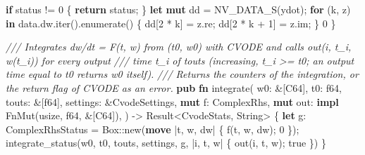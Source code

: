 \documentclass[
  10pt,
]{article}
\newenvironment{Shaded}{}{}
\newcommand{\BuiltInTok}[1]{\textcolor[rgb]{0.00,0.50,0.00}{#1}}
\newcommand{\CommentTok}[1]{\textcolor[rgb]{0.38,0.63,0.69}{\textit{#1}}}
\newcommand{\ConstantTok}[1]{\textcolor[rgb]{0.53,0.00,0.00}{#1}}
\newcommand{\ControlFlowTok}[1]{\textcolor[rgb]{0.00,0.44,0.13}{\textbf{#1}}}
\newcommand{\DataTypeTok}[1]{\textcolor[rgb]{0.56,0.13,0.00}{#1}}
\newcommand{\DecValTok}[1]{\textcolor[rgb]{0.25,0.63,0.44}{#1}}
\newcommand{\KeywordTok}[1]{\textcolor[rgb]{0.00,0.44,0.13}{\textbf{#1}}}
\newcommand{\NormalTok}[1]{#1}
\newcommand{\OperatorTok}[1]{\textcolor[rgb]{0.40,0.40,0.40}{#1}}
\newcommand{\PreprocessorTok}[1]{\textcolor[rgb]{0.74,0.48,0.00}{#1}}
\begin{document}
\begin{Shaded}
\begin{Highlighting}[]
    \ControlFlowTok{if}\NormalTok{ status }\OperatorTok{!=} \DecValTok{0} \OperatorTok{\{}
        \ControlFlowTok{return}\NormalTok{ status}\OperatorTok{;}
    \OperatorTok{\}}
    \KeywordTok{let} \KeywordTok{mut}\NormalTok{ dd }\OperatorTok{=}\NormalTok{ NV\_DATA\_S(ydot)}\OperatorTok{;}
    \ControlFlowTok{for}\NormalTok{ (k}\OperatorTok{,}\NormalTok{ z) }\KeywordTok{in}\NormalTok{ data}\OperatorTok{.}\NormalTok{dw}\OperatorTok{.}\NormalTok{iter()}\OperatorTok{.}\NormalTok{enumerate() }\OperatorTok{\{}
\NormalTok{        dd[}\DecValTok{2} \OperatorTok{*}\NormalTok{ k] }\OperatorTok{=}\NormalTok{ z}\OperatorTok{.}\NormalTok{re}\OperatorTok{;}
\NormalTok{        dd[}\DecValTok{2} \OperatorTok{*}\NormalTok{ k }\OperatorTok{+} \DecValTok{1}\NormalTok{] }\OperatorTok{=}\NormalTok{ z}\OperatorTok{.}\NormalTok{im}\OperatorTok{;}
    \OperatorTok{\}}
    \DecValTok{0}
\OperatorTok{\}}

\CommentTok{/// Integrates dw/dt = F(t, w) from (t0, w0) with CVODE and calls \textasciigrave{}out(i, t\_i, w(t\_i))\textasciigrave{} for every output}
\CommentTok{/// time t\_i of \textasciigrave{}touts\textasciigrave{} (increasing, t\_i \textgreater{}= t0; an output time equal to t0 returns w0 itself).}
\CommentTok{/// Returns the counters of the integration, or the return flag of CVODE as an error.}
\KeywordTok{pub} \KeywordTok{fn}\NormalTok{ integrate(}
\NormalTok{    w0}\OperatorTok{:} \OperatorTok{\&}\NormalTok{[C64]}\OperatorTok{,}
\NormalTok{    t0}\OperatorTok{:} \DataTypeTok{f64}\OperatorTok{,}
\NormalTok{    touts}\OperatorTok{:} \OperatorTok{\&}\NormalTok{[}\DataTypeTok{f64}\NormalTok{]}\OperatorTok{,}
\NormalTok{    settings}\OperatorTok{:} \OperatorTok{\&}\NormalTok{CvodeSettings}\OperatorTok{,}
    \KeywordTok{mut}\NormalTok{ f}\OperatorTok{:}\NormalTok{ ComplexRhs}\OperatorTok{,}
    \KeywordTok{mut}\NormalTok{ out}\OperatorTok{:} \KeywordTok{impl} \BuiltInTok{FnMut}\NormalTok{(}\DataTypeTok{usize}\OperatorTok{,} \DataTypeTok{f64}\OperatorTok{,} \OperatorTok{\&}\NormalTok{[C64])}\OperatorTok{,}
\NormalTok{) }\OperatorTok{{-}\textgreater{}} \DataTypeTok{Result}\OperatorTok{\textless{}}\NormalTok{CvodeStats}\OperatorTok{,} \DataTypeTok{String}\OperatorTok{\textgreater{}} \OperatorTok{\{}
    \KeywordTok{let}\NormalTok{ g}\OperatorTok{:}\NormalTok{ ComplexRhsStatus }\OperatorTok{=} \DataTypeTok{Box}\PreprocessorTok{::}\NormalTok{new(}\KeywordTok{move} \OperatorTok{|}\NormalTok{t}\OperatorTok{,}\NormalTok{ w}\OperatorTok{,}\NormalTok{ dw}\OperatorTok{|} \OperatorTok{\{}
\NormalTok{        f(t}\OperatorTok{,}\NormalTok{ w}\OperatorTok{,}\NormalTok{ dw)}\OperatorTok{;}
        \DecValTok{0}
    \OperatorTok{\}}\NormalTok{)}\OperatorTok{;}
\NormalTok{    integrate\_status(w0}\OperatorTok{,}\NormalTok{ t0}\OperatorTok{,}\NormalTok{ touts}\OperatorTok{,}\NormalTok{ settings}\OperatorTok{,}\NormalTok{ g}\OperatorTok{,} \OperatorTok{|}\NormalTok{i}\OperatorTok{,}\NormalTok{ t}\OperatorTok{,}\NormalTok{ w}\OperatorTok{|} \OperatorTok{\{}
\NormalTok{        out(i}\OperatorTok{,}\NormalTok{ t}\OperatorTok{,}\NormalTok{ w)}\OperatorTok{;}
        \ConstantTok{true}
    \OperatorTok{\}}\NormalTok{)}
\OperatorTok{\}}


\end{Highlighting}
\end{Shaded}
\end{document}
